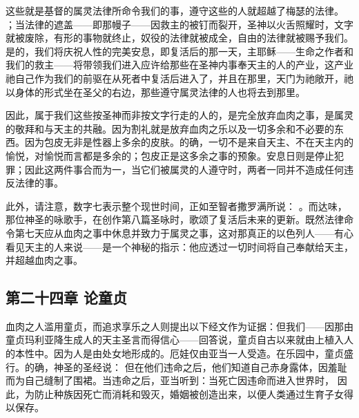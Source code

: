 这些就是基督的属灵法律所命令我们的事，遵守这些的人就超越了梅瑟的法律。 ；当法律的遮盖——即那幔子——因救主的被钉而裂开，圣神以火舌照耀时，文字就被废除，有形的事物就终止，奴役的法律就被成全，自由的法律就被赐予我们。是的，我们将庆祝人性的完美安息，即复活后的那一天，主耶稣——生命之作者和我们的救主——将带领我们进入应许给那些在圣神内事奉天主的人的产业，这产业祂自己作为我们的前驱在从死者中复活后进入了，并且在那里，天门为祂敞开，祂以身体的形式坐在圣父的右边，那些遵守属灵法律的人也将去到那里。\par

因此，属于我们这些按圣神而非按文字行走的人的，是完全放弃血肉之事，是属灵的敬拜和与天主的共融。因为割礼就是放弃血肉之乐以及一切多余和不必要的东西。因为包皮无非是性器上多余的皮肤。的确，一切不是来自天主、不在天主内的愉悦，对愉悦而言都是多余的；包皮正是这多余之事的预象。安息日则是停止犯罪；因此这两件事合而为一，当它们被属灵的人遵守时，两者一同并不造成任何违反法律的事。\par

此外，请注意，数字七表示整个现世时间，正如至智者撒罗满所说： 。而达味，那位神圣的咏歌手，在创作第八篇圣咏时，歌颂了复活后未来的更新。既然法律命令第七天应从血肉之事中休息并致力于属灵之事，这对那真正的以色列人——有心看见天主的人来说——是一个神秘的指示：他应透过一切时间将自己奉献给天主，并超越血肉之事。\par


\subsection{第二十四章 论童贞}

血肉之人滥用童贞，而追求享乐之人则提出以下经文作为证据：但我们——因那由童贞玛利亚降生成人的天主圣言而得信心——回答说，童贞自古以来就由上植入人的本性中。因为人是由处女地形成的。厄娃仅由亚当一人受造。在乐园中，童贞盛行。的确，神圣的圣经说： 但在他们违命之后，他们知道自己赤身露体，因羞耻而为自己缝制了围裙。当违命之后，亚当听到：当死亡因违命而进入世界时， 因此，为防止种族因死亡而消耗和毁灭，婚姻被创造出来，以便人类通过生育子女得以保存。\par

